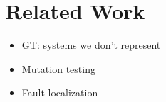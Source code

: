 \section{Related Work}

\begin{itemize}
  \item  GT: systems we don't represent
  \item Mutation testing
  \item Fault localization
\end{itemize}    

